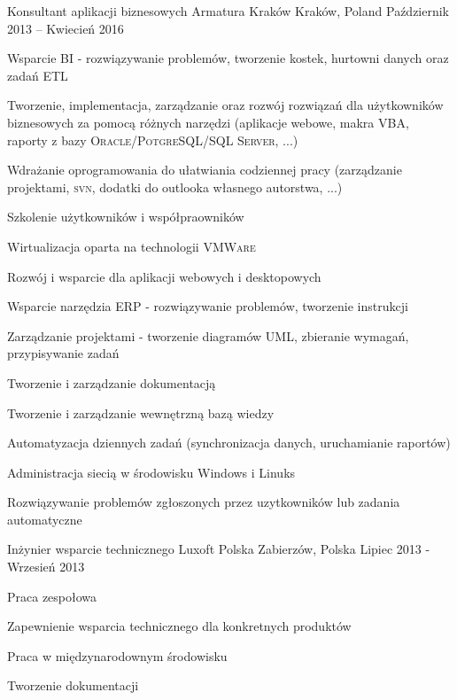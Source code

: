 \begin{cventries}
  \cventry
    {Konsultant aplikacji biznesowych}
    {Armatura Kraków}
    {Kraków, Poland}
    {Październik 2013 -- Kwiecień 2016}
    {\begin{cvitems} 
        \item {Wsparcie BI - rozwiązywanie problemów, tworzenie kostek, hurtowni danych oraz zadań \textsc{ETL}}
		\item {Tworzenie, implementacja, zarządzanie oraz rozwój rozwiązań dla użytkowników biznesowych za pomocą różnych narzędzi (aplikacje webowe, makra \textsc{VBA}, raporty z bazy \textsc{Oracle}/\textsc{PotgreSQL}/\textsc{SQL Server}, ...)}
		\item {Wdrażanie oprogramowania do ułatwiania codziennej pracy (zarządzanie projektami, \textsc{svn}, dodatki do outlooka własnego autorstwa, ...)}
		\item {Szkolenie użytkowników i współpraowników}
        \item {Wirtualizacja oparta na technologii \textsc{VMWare}}
   		\item {Rozwój i wsparcie dla aplikacji webowych i desktopowych}
		\item {Wsparcie narzędzia ERP - rozwiązywanie problemów, tworzenie instrukcji}
		\item {Zarządzanie projektami - tworzenie diagramów \textsc{UML}, zbieranie wymagań, przypisywanie zadań}
		\item {Tworzenie i zarządzanie dokumentacją}
        \item {Tworzenie i zarządzanie wewnętrzną bazą wiedzy}
        \item {Automatyzacja dziennych zadań (synchronizacja danych, uruchamianie raportów)}
        \item {Administracja siecią w środowisku Windows i Linuks}
        \item {Rozwiązywanie problemów zgłoszonych przez uzytkowników lub zadania automatyczne}
    \end{cvitems}}

  \cventry
    {Inżynier wsparcie technicznego} 
    {Luxoft Polska}
    {Zabierzów, Polska} 
    {Lipiec 2013 - Wrzesień 2013} 
    {\begin{cvitems} 
		\item {Praca zespołowa}
       	\item {Zapewnienie wsparcia technicznego dla konkretnych produktów}
       	\item {Praca w międzynarodownym środowisku}
		\item {Tworzenie dokumentacji}
    \end{cvitems}}


\end{cventries}
